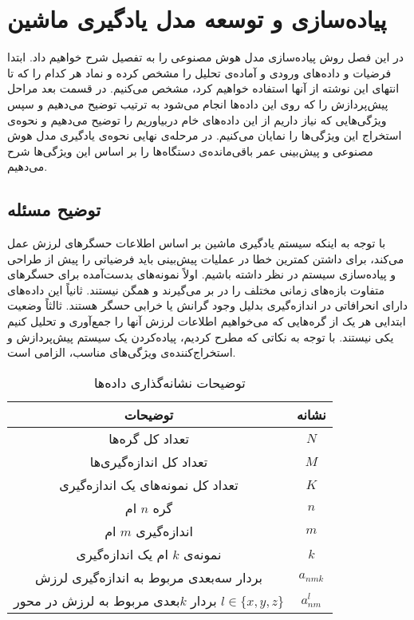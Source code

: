 \chapter{پیاده‌سازی و توسعه مدل یادگیری ماشین}

در این فصل روش پیاده‌سازی مدل هوش مصنوعی را به تفصیل شرح خواهیم داد. ابتدا فرضیات و داده‌های ورودی و آماده‌ی تحلیل را مشخص کرده و نماد هر کدام را که تا انتهای این نوشته از آنها استفاده خواهیم کرد، مشخص می‌کنیم. در قسمت بعد مراحل پیش‌پردازش را که روی این داده‌ها انجام می‌شود به ترتیب توضیح می‌دهیم و سپس ویژگی‌هایی که نیاز داریم از این داده‌های خام دربیاوریم را توضیح می‌دهیم و نحوه‌ی استخراج این ویژگی‌ها را نمایان می‌کنیم. در مرحله‌ی نهایی نحوه‌ی یادگیری مدل هوش مصنوعی و پیش‌بینی عمر باقی‌مانده‌ی دستگاه‌ها را بر اساس این ویژگی‌ها شرح می‌دهیم.


\section{توضیح مسئله}
با توجه به اینکه سیستم یادگیری ماشین بر اساس اطلاعات حسگرهای لرزش عمل می‌کند، برای داشتن کمترین خطا در عملیات پیش‌بینی باید فرضیاتی را پیش از طراحی و پیاده‌سازی سیستم در نظر داشته باشیم. اولاً نمونه‌های بدست‌آمده برای حسگرهای متفاوت بازه‌های زمانی مختلف را در بر می‌گیرند و همگن نیستند. ثانیاً این داده‌های دارای انحرافاتی در اندازه‌گیری بدلیل وجود گرانش یا خرابی حسگر هستند. ثالثاً وضعیت ابتدایی هر یک از گره‌هایی که می‌خواهیم اطلاعات لرزش آنها را جمع‌آوری و تحلیل کنیم یکی نیستند\cite{jung2017vibration}. با توجه به نکاتی که مطرح کردیم، پیاده‌کردن یک سیستم پیش‌پردازش و استخراج‌کننده‌ی ویژگی‌های مناسب، الزامی است. 

\begin{table}[h!]
  \begin{center}
    \caption{توضیحات نشانه‌گذاری داده‌ها}
    \label{table:notation_description}
    \begin{tabular}{|c|c|} %
    	\hline
توضیحات & نشانه\\
    	\hline \hline
تعداد کل گره‌ها & $N$\\
    	\hline
 تعداد کل اندازه‌گیری‌ها & $M$\\
    	\hline
   تعداد کل نمونه‌های یک اندازه‌گیری & $K$\\
    	\hline
گره $n$ ام & $n$\\
 	\hline
اندازه‌گیری $m$ ام & $m$\\
 	\hline
نمونه‌ی $k$ ام یک اندازه‌گیری & $k$\\
 	\hline
بردار سه‌بعدی مربوط به اندازه‌گیری لرزش & $a_{nmk}$\\
 	\hline
بردار $k$بعدی مربوط به لرزش در محور $l \in \{x, y, z\}$  & $a^l_{nm}$\\
 	\hline
    \end{tabular}
  \end{center}
\end{table} 

